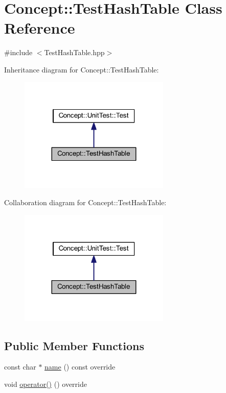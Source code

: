 \hypertarget{class_concept_1_1_test_hash_table}{}\section{Concept\+::Test\+Hash\+Table Class Reference}
\label{class_concept_1_1_test_hash_table}


{\ttfamily \#include $<$Test\+Hash\+Table.\+hpp$>$}



Inheritance diagram for Concept\+::Test\+Hash\+Table\+:\nopagebreak
\begin{figure}[H]
\begin{center}
\leavevmode
\includegraphics[width=203pt]{class_concept_1_1_test_hash_table__inherit__graph}
\end{center}
\end{figure}


Collaboration diagram for Concept\+::Test\+Hash\+Table\+:\nopagebreak
\begin{figure}[H]
\begin{center}
\leavevmode
\includegraphics[width=203pt]{class_concept_1_1_test_hash_table__coll__graph}
\end{center}
\end{figure}
\subsection*{Public Member Functions}
\begin{DoxyCompactItemize}
\item 
const char $\ast$ \mbox{\hyperlink{class_concept_1_1_test_hash_table_ace0c357ea2d8dbd2cc7d7d8dae9e35ec}{name}} () const override
\item 
void \mbox{\hyperlink{class_concept_1_1_test_hash_table_a64943226aff8a1ac3f3d1b875159bdfe}{operator()}} () override
\end{DoxyCompactItemize}
